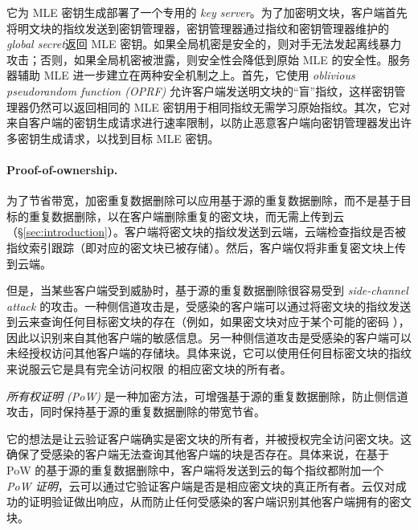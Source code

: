 它为 MLE 密钥生成部署了一个专用的 \textit{ key server}。为了加密明文块，客户端首先将明文块的指纹发送到密钥管理器，密钥管理器通过指纹和密钥管理器维护的\textit{ global secret}返回 MLE 密钥。如果全局机密是安全的，则对手无法发起离线暴力攻击；否则，如果全局机密被泄露，则安全性会降低到原始 MLE 的安全性。服务器辅助 MLE 进一步建立在两种安全机制之上。首先，它使用 \textit{ oblivious pseudorandom function (OPRF)} \cite{naor04} 允许客户端发送明文块的“盲”指纹，这样密钥管理器仍然可以返回相同的 MLE 密钥用于相同指纹无需学习原始指纹。其次，它对来自客户端的密钥生成请求进行速率限制，以防止恶意客户端向密钥管理器发出许多密钥生成请求，以找到目标 MLE 密钥。

\paragraph{Proof-of-ownership.} 为了节省带宽，加密重复数据删除可以应用基于源的重复数据删除，而不是基于目标的重复数据删除，以在客户端删除重复的密文块，而无需上传到云（\S\ref{sec:introduction}）。客户端将密文块的指纹发送到云端，云端检查指纹是否被指纹索引跟踪（即对应的密文块已被存储）。然后，客户端仅将非重复密文块上传到云端。


但是，当某些客户端受到威胁时，基于源的重复数据删除很容易受到 \textit{ side-channel attack} \cite{harnik10,halevi11} 的攻击。一种侧信道攻击是，受感染的客户端可以通过将密文块的指纹发送到云来查询任何目标密文块的存在（例如，如果密文块对应于某个可能的密码 \cite{harnik10}），因此以识别来自其​​他客户端的敏感信息。另一种侧信道攻击是受感染的客户端可以未经授权访问其他客户端的存储块。具体来说，它可以使用任何目标密文块的指纹来说服云它是具有完全访问权限 \cite{halevi11} 的相应密文块的所有者。


\textit{ 所有权证明 (PoW)} \cite{halevi11} 是一种加密方法，可增强基于源的重复数据删除，防止侧信道攻击，同时保持基于源的重复数据删除的带宽节省。

它的想法是让云验证客户端确实是密文块的所有者，并被授权完全访问密文块。这确保了受感染的客户端无法查询其他客户端的块是否存在。具体来说，在基于 PoW 的基于源的重复数据删除中，客户端将发送到云的每个指纹都附加一个 \textit{ PoW 证明}，云可以通过它验证客户端是否是相应密文块的真正所有者。云仅对成功的证明验证做出响应，从而防止任何受感染的客户端识别其他客户端拥有的密文块。 

